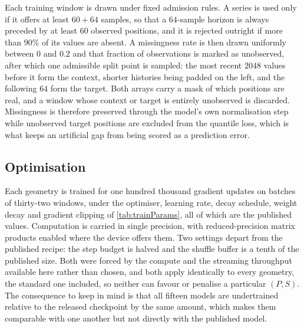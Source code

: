Each training window is drawn under fixed admission rules. A series is used only if it offers at least $60+64$ samples, so that a $64$-sample horizon is always preceded by at least $60$ observed positions, and it is rejected outright if more than $90\%$ of its values are absent. A missingness rate is then drawn uniformly between $0$ and $0.2$ and that fraction of observations is marked as unobserved, after which one admissible split point is sampled: the most recent $2048$ values before it form the context, shorter histories being padded on the left, and the following $64$ form the target. Both arrays carry a mask of which positions are real, and a window whose context or target is entirely unobserved is discarded. Missingness is therefore preserved through the model's own normalisation step while unobserved target positions are excluded from the quantile loss, which is what keeps an artificial gap from being scored as a prediction error.

\subsection{Optimisation}

Each geometry is trained for one hundred thousand gradient updates on batches of thirty-two windows, under the optimiser, learning rate, decay schedule, weight decay and gradient clipping of \autoref{tab:trainParams}, all of which are the published values. Computation is carried in single precision, with reduced-precision matrix products enabled where the device offers them. Two settings depart from the published recipe: the step budget is halved and the shuffle buffer is a tenth of the published size. Both were forced by the compute and the streaming throughput available here rather than chosen, and both apply identically to every geometry, the standard one included, so neither can favour or penalise a particular $(P,S)$. The consequence to keep in mind is that all fifteen models are undertrained relative to the released checkpoint by the same amount, which makes them comparable with one another but not directly with the published model.
